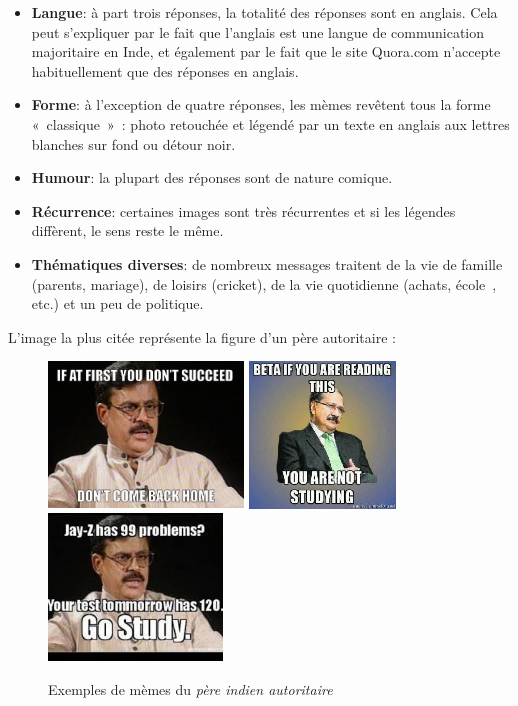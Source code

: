\begin{itemize}
\item
\textbf{Langue}: à part trois réponses, la totalité des réponses sont en anglais. Cela peut s’expliquer par le fait que l’anglais est une langue de communication majoritaire en Inde, et également par le fait que le site Quora.com n’accepte habituellement que des réponses en anglais.
\item
\textbf{Forme}: à l’exception de quatre réponses, les mèmes revêtent tous la forme « classique » : photo retouchée et légendé par un texte en anglais aux lettres blanches sur fond ou détour noir.

\item
\textbf{Humour}: la plupart des réponses sont de nature comique.
\item
\textbf{Récurrence}: certaines images sont très récurrentes et si les légendes diffèrent, le sens reste le même.
\item
\textbf{Thématiques diverses}: de nombreux messages traitent de la vie de famille (parents, mariage), de loisirs (cricket), de la vie quotidienne (achats, école , etc.) et un peu de politique.
\end{itemize}

L{\textquoteright}image la plus cit\'ee repr\'esente la figure
d{\textquoteright}un p\`ere autoritaire :

\begin{figure}
    \includegraphics[width=2.0449in,height=1.5335in]{figures/chap2/chapitre2-img8.jpg}
    \includegraphics[width=1.5335in,height=1.5335in]{figures/chap2/chapitre2-img9.jpg}
    \includegraphics[width=1.8224in,height=1.5449in]{figures/chap2/chapitre2-img10.jpg}
    \caption[\textit{"High Expectations Indian Father"} d'après Quora.com]{Exemples de m\`emes du \textit{p\`ere indien autoritaire}}
    \label{fig:severe-indian-dad}
\end{figure}



